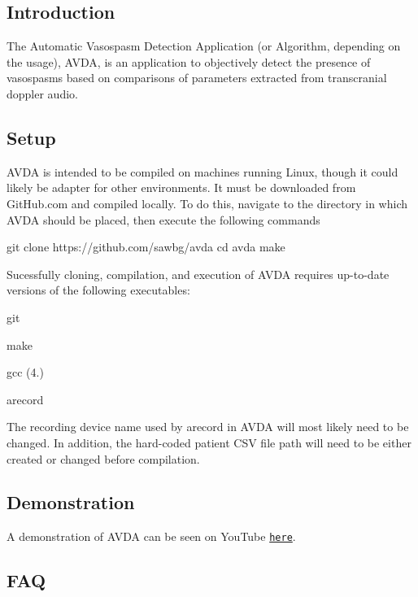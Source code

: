 \subsection*{Introduction}

The Automatic Vasospasm Detection Application (or Algorithm, depending on the usage), A\+V\+D\+A, is an application to objectively detect the presence of vasospasms based on comparisons of parameters extracted from transcranial doppler audio.

\subsection*{Setup}

A\+V\+D\+A is intended to be compiled on machines running Linux, though it could likely be adapter for other environments. It must be downloaded from Git\+Hub.\+com and compiled locally. To do this, navigate to the directory in which A\+V\+D\+A should be placed, then execute the following commands \begin{DoxyVerb}git clone https://github.com/sawbg/avda
cd avda
make
\end{DoxyVerb}


Sucessfully cloning, compilation, and execution of A\+V\+D\+A requires up-\/to-\/date versions of the following executables\+:


\begin{DoxyItemize}
\item git
\item make
\item gcc (4.)
\item arecord
\end{DoxyItemize}

The recording device name used by arecord in A\+V\+D\+A will most likely need to be changed. In addition, the hard-\/coded patient C\+S\+V file path will need to be either created or changed before compilation.

\subsection*{Demonstration}

A demonstration of A\+V\+D\+A can be seen on You\+Tube \href{https://www.youtube.com/watch?v=HnQShhHQ_M0}{\tt here}.

\subsection*{F\+A\+Q}


